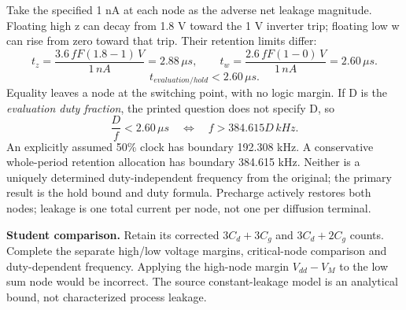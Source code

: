 \documentclass[10pt]{article}
\begin{document}
Take the specified 1 nA at each node as the adverse net leakage magnitude. Floating high z can decay from 1.8 V toward the 1 V inverter trip; floating low w can rise from zero toward that trip. Their retention limits differ:
\[t_z=\frac{3.6\,fF(1.8-1)\,V}{1\,nA}=2.88\,\mu s,\qquad
t_w=\frac{2.6\,fF(1-0)\,V}{1\,nA}=2.60\,\mu s.\]
\[\boxed{t_{evaluation/hold}<2.60\,\mu s.}\]
Equality leaves a node at the switching point, with no logic margin. If D is the \emph{evaluation duty fraction}, the printed question does not specify D, so
\[\boxed{\frac{D}{f}<2.60\,\mu s\quad\Longleftrightarrow\quad f>384.615D\,kHz.}\]
An explicitly assumed 50\% clock has boundary 192.308 kHz. A conservative whole-period retention allocation has boundary 384.615 kHz. Neither is a uniquely determined duty-independent frequency from the original; the primary result is the hold bound and duty formula. Precharge actively restores both nodes; leakage is one total current per node, not one per diffusion terminal.

\textbf{Student comparison.} Retain its corrected $3C_d+3C_g$ and $3C_d+2C_g$ counts. Complete the separate high/low voltage margins, critical-node comparison and duty-dependent frequency. Applying the high-node margin $V_{dd}-V_M$ to the low sum node would be incorrect. The source constant-leakage model is an analytical bound, not characterized process leakage.
\end{document}
